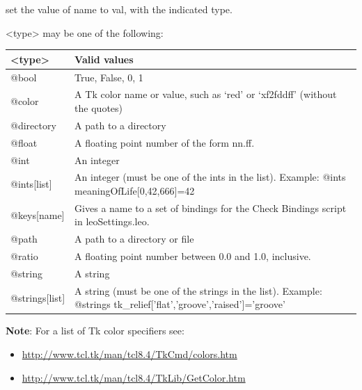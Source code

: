 \documentclass[a4paper,10pt,english]{sphinxmanual}
\begin{document}
set the value of name to val, with the indicated type.

\textless{}type\textgreater{} may be one of the following:

\begin{tabulary}{\linewidth}{|L|L|}
\hline

\textless{}type\textgreater{}
 & 
Valid values
\\\hline

@bool
 & 
True, False, 0, 1
\\\hline

@color
 & 
A Tk color name or value, such as `red' or `xf2fddff' (without the quotes)
\\\hline

@directory
 & 
A path to a directory
\\\hline

@float
 & 
A floating point number of the form nn.ff.
\\\hline

@int
 & 
An integer
\\\hline

@ints{[}list{]}
 & 
An integer (must be one of the ints in the list).
Example: @ints meaningOfLife{[}0,42,666{]}=42
\\\hline

@keys{[}name{]}
 & 
Gives a name to a set of bindings for the Check Bindings script in leoSettings.leo.
\\\hline

@path
 & 
A path to a directory or file
\\\hline

@ratio
 & 
A floating point number between 0.0 and 1.0, inclusive.
\\\hline

@string
 & 
A string
\\\hline

@strings{[}list{]}
 & 
A string (must be one of the strings in the list).
Example: @strings tk\_relief{[}'flat','groove','raised'{]}='groove'
\\\hline
\end{tabulary}


\textbf{Note}: For a list of Tk color specifiers see:
\begin{itemize}
\item {} 
\href{http://www.tcl.tk/man/tcl8.4/TkCmd/colors.htm}{http://www.tcl.tk/man/tcl8.4/TkCmd/colors.htm}

\item {} 
\href{http://www.tcl.tk/man/tcl8.4/TkLib/GetColor.htm}{http://www.tcl.tk/man/tcl8.4/TkLib/GetColor.htm}

\end{itemize}
\end{document}
